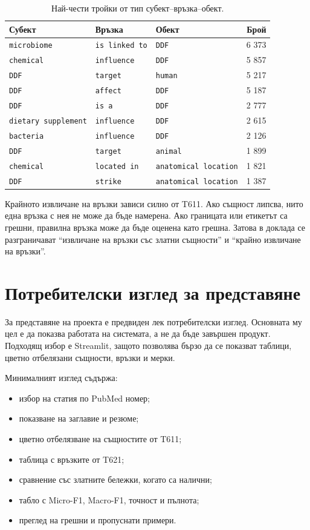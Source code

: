\documentclass[12pt,a4paper]{article}
\begin{document}
\begin{longtable}{lll r}
\caption{Най-чести тройки от тип субект--връзка--обект.}\\
\toprule
\textbf{Субект} & \textbf{Връзка} & \textbf{Обект} & \textbf{Брой} \\
\midrule
\texttt{microbiome} & \texttt{is linked to} & \texttt{DDF} & 6 373 \\
\texttt{chemical} & \texttt{influence} & \texttt{DDF} & 5 857 \\
\texttt{DDF} & \texttt{target} & \texttt{human} & 5 217 \\
\texttt{DDF} & \texttt{affect} & \texttt{DDF} & 5 187 \\
\texttt{DDF} & \texttt{is a} & \texttt{DDF} & 2 777 \\
\texttt{dietary supplement} & \texttt{influence} & \texttt{DDF} & 2 615 \\
\texttt{bacteria} & \texttt{influence} & \texttt{DDF} & 2 126 \\
\texttt{DDF} & \texttt{target} & \texttt{animal} & 1 899 \\
\texttt{chemical} & \texttt{located in} & \texttt{anatomical location} & 1 821 \\
\texttt{DDF} & \texttt{strike} & \texttt{anatomical location} & 1 387 \\
\bottomrule
\end{longtable}

Крайното извличане на връзки зависи силно от T611. Ако същност липсва, нито една връзка с нея не може да бъде намерена. Ако границата или етикетът са грешни, правилна връзка може да бъде оценена като грешна. Затова в доклада се разграничават ``извличане на връзки със златни същности'' и ``крайно извличане на връзки''.

\section{Потребителски изглед за представяне}

За представяне на проекта е предвиден лек потребителски изглед. Основната му цел е да показва работата на системата, а не да бъде завършен продукт. Подходящ избор е Streamlit, защото позволява бързо да се показват таблици, цветно отбелязани същности, връзки и мерки.

Минималният изглед съдържа:

\begin{itemize}
\item избор на статия по PubMed номер;
\item показване на заглавие и резюме;
\item цветно отбелязване на същностите от T611;
\item таблица с връзките от T621;
\item сравнение със златните бележки, когато са налични;
\item табло с Micro-F1, Macro-F1, точност и пълнота;
\item преглед на грешни и пропуснати примери.
\end{itemize}
\end{document}
